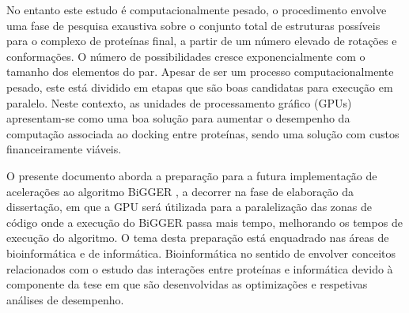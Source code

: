 No entanto este estudo é computacionalmente pesado, o procedimento envolve uma fase de pesquisa exaustiva sobre o conjunto total de estruturas possíveis para o complexo de proteínas final, a partir de um número elevado de rotações e conformações. O número de possibilidades cresce exponencialmente com o tamanho dos elementos do par\cite{halperin}.
  Apesar de ser um processo computacionalmente pesado, este está dividido em etapas que são boas candidatas para execução em paralelo. Neste contexto, as unidades de processamento gráfico (GPUs) apresentam-se como uma boa solução para aumentar o desempenho da computação associada ao docking entre proteínas, sendo uma solução com custos financeiramente viáveis.
   
O presente documento aborda a preparação para a futura implementação de acelerações ao algoritmo BiGGER \cite{biggerPaper}, a decorrer na fase de elaboração da dissertação, em que a GPU será útilizada para a paralelização das zonas de código onde a execução do BiGGER passa mais tempo, melhorando os tempos de execução do algoritmo.
O tema desta preparação está enquadrado nas áreas de bioinformática e de informática. Bioinformática no sentido de envolver conceitos relacionados com o estudo das interações entre proteínas e informática devido à componente da tese em que são desenvolvidas as optimizações e respetivas análises de desempenho.

